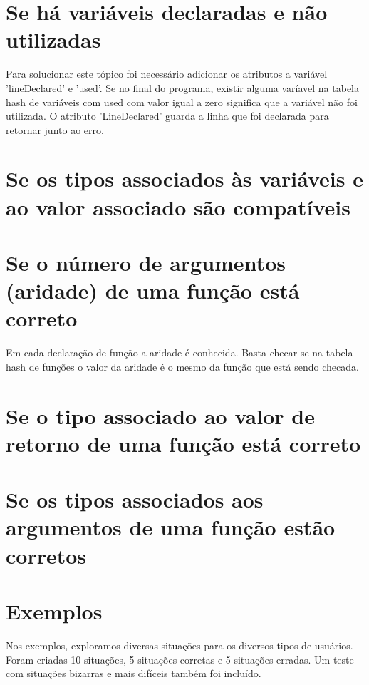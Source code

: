 \documentclass[a4paper,10pt]{article}
\begin{document}
\section{Se há variáveis declaradas e não utilizadas}
Para solucionar este tópico foi necessário adicionar os atributos a variável 'lineDeclared' e 'used'. Se no final do programa, existir alguma varíavel na tabela hash de variáveis
com used com valor igual a zero significa que a variável não foi utilizada. O atributo 'LineDeclared' guarda a linha que foi declarada para retornar junto ao erro.
\section{Se os tipos associados às variáveis e ao valor associado são compatíveis}

\section{Se o número de argumentos (aridade) de uma função está correto}
Em cada declaração de função a aridade é conhecida. Basta checar se na tabela hash de funções o valor da aridade é o mesmo da função que está sendo checada.
\section{Se o tipo associado ao valor de retorno de uma função está correto}

\section{Se os tipos associados aos argumentos de uma função estão corretos}

\section{Exemplos}
Nos exemplos, exploramos diversas situações para os diversos tipos de usuários. Foram criadas 10 situações, 5 situações corretas e 5 
situações erradas. Um teste com situações bizarras e mais difíceis também foi incluído.
\end{document}
